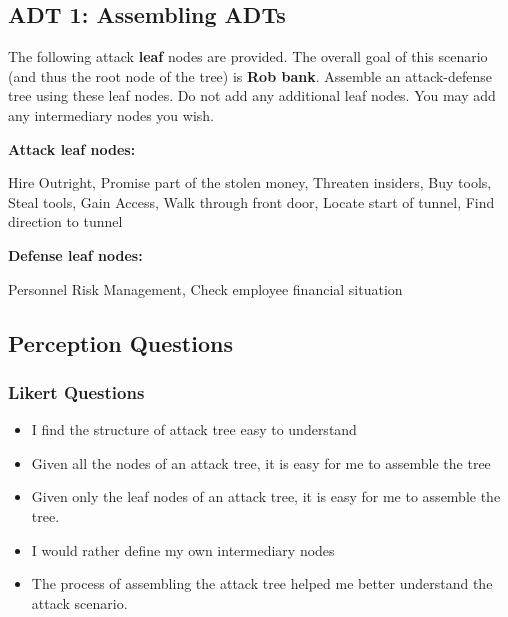 
\subsection*{ADT 1: Assembling ADTs}

The following attack \textbf{leaf} nodes are provided. The overall goal of this scenario (and thus the root node of the tree) is \textbf{Rob bank}. Assemble an attack-defense tree using these leaf nodes. Do not add any additional leaf nodes. You may add any intermediary nodes you wish.

\textbf{Attack leaf nodes:}


Hire Outright, Promise part of the stolen money, Threaten insiders, Buy tools, Steal tools, Gain Access, Walk through front door, Locate start of tunnel, Find direction to tunnel

\textbf{Defense leaf nodes:}

Personnel Risk Management, Check employee financial situation


\subsection*{Perception Questions}


\subsubsection*{Likert Questions}
\begin{itemize}
  \setlength{\itemindent}{\qIndent}
  \item[\surveyq{LS-ADT1-L1}] I find the structure of attack tree easy to understand
  \item[\surveyq{LS-ADT1-L2}] Given all the nodes of an attack tree, it is easy for me to assemble the tree
  \item[\surveyq{LS-ADT1-L3}] Given only the leaf nodes of an attack tree, it is easy for me to assemble the tree.
  \item[\surveyq{LS-ADT1-L4}] I would rather define my own intermediary nodes
  \item[\surveyq{LS-ADT1-L5}] The process of assembling the attack tree helped me better understand the attack scenario.
\end{itemize}

